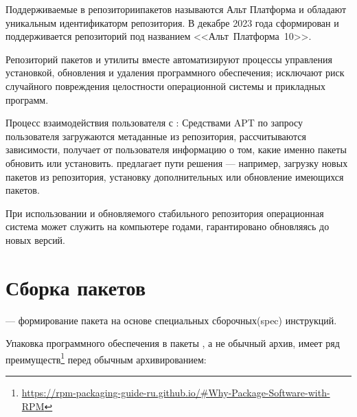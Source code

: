 Поддерживаемые в  репозиториипакетов называются Альт Платформа и обладают уникальным идентификаторм
репозитория. В декабре 2023 года сформирован и поддерживается репозиторий  под названием <<Альт~Платформа~10>>.

Репозиторий пакетов и утилиты  вместе автоматизируют процессы управления установкой, обновления и удаления
программного обеспечения; исключают риск случайного повреждения целостности операционной системы и прикладных 
программ.

Процесс взаимодействия пользователя с : Средствами APT по запросу пользователя загружаются метаданные
из репозитория, рассчитываются зависимости,  получает от пользователя информацию о том,
какие именно пакеты обновить или установить.  предлагает пути решения --- например, загрузку
новых пакетов из репозитория, установку дополнительных или обновление имеющихся пакетов.


При использовании  и обновляемого стабильного репозитория операционная система может 
служить на компьютере годами, гарантировано обновляясь до новых версий.

\hypertarget{1.3}{\section{Сборка пакетов}}
 --- формирование пакета на основе специальных сборочных(spec) инструкций.

 Упаковка программного обеспечения в пакеты , а не обычный архив, имеет ряд
преимуществ\footnote{\href{https://rpm-packaging-guide-ru.github.io/\#Why-Package-Software-with-RPM}
{https://rpm-packaging-guide-ru.github.io/\#Why-Package-Software-with-RPM}} перед обычным архивированием:

